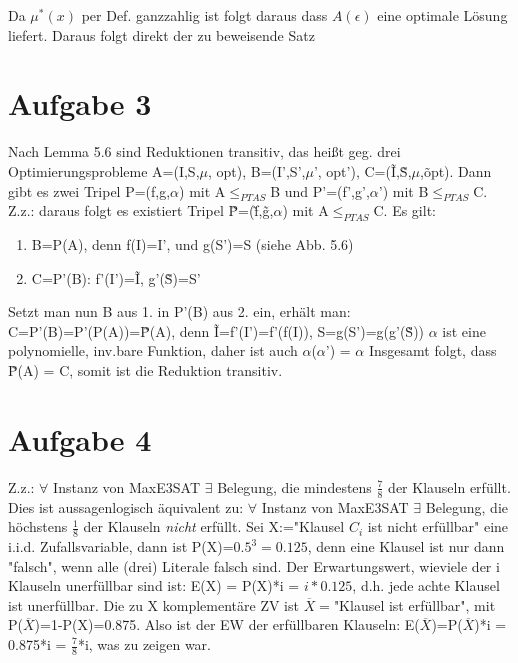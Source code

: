 \documentclass[a4paper,10pt,oneside,reqno]{scrartcl}
\begin{document}
Da $\mu^*(x)$ per Def. ganzzahlig ist folgt daraus dass $A(\epsilon)$ eine optimale Lösung liefert. Daraus folgt direkt der zu beweisende Satz
\section*{Aufgabe 3}%
Nach Lemma 5.6 sind Reduktionen transitiv, das heißt geg. drei Optimierungsprobleme A=(I,S,$\mu$, opt), B=(I',S',$\mu$', opt'), C=(\~{I},\~{S},\~{$\mu$},\~{o}pt).\newline
Dann gibt es zwei Tripel P=(f,g,$\alpha$) mit A$\leq_{PTAS}$B und P'=(f',g',$\alpha$') mit B$\leq_{PTAS}$C.\newline
Z.z.: daraus folgt es existiert Tripel \~{P}=(\~{f},\~{g},\~{$\alpha$}) mit A$\leq_{PTAS}$C.\newline
Es gilt:\begin{enumerate}
         \item B=P(A), denn f(I)=I', und g(S')=S (siehe Abb. 5.6)
         \item C=P'(B): f'(I')=\~{I}, g'(\~{S})=S'
        \end{enumerate}
        Setzt man nun B aus 1. in P'(B) aus 2. ein, erhält man:\newline
        C=P'(B)=P'(P(A))=\~{P}(A), denn \~{I}=f'(I')=f'(f(I)), S=g(S')=g(g'(\~{S}))\newline
        $\alpha$ ist eine polynomielle, inv.bare Funktion, daher ist auch $\alpha$($\alpha$') = \~{$\alpha$}\newline
        Insgesamt folgt, dass \~{P}(A) = C, somit ist die Reduktion transitiv.

\section*{Aufgabe 4}%
Z.z.: $\forall$ Instanz von MaxE3SAT $\exists$ Belegung, die mindestens $\frac{7}{8}$ der
Klauseln erfüllt. Dies ist aussagenlogisch äquivalent zu: \newline
$\forall$ Instanz von MaxE3SAT $\exists$ Belegung, die höchstens $\frac{1}{8}$ der
Klauseln \emph{nicht} erfüllt.\newline
Sei X:="Klausel $C_i$ ist nicht erfüllbar" eine i.i.d. Zufallsvariable, dann ist P(X)=$0.5^3=0.125$, denn eine Klausel ist nur dann "falsch", wenn alle (drei) Literale falsch sind. Der Erwartungswert,
wieviele der i Klauseln unerfüllbar sind ist:\newline
E(X) = P(X)*i = $i*0.125$, d.h. jede achte Klausel ist unerfüllbar. Die zu X komplementäre ZV ist $\overline{X}=$"Klausel ist erfüllbar", mit P($\overline{X}$)=1-P(X)=0.875.\newline
Also ist der EW der erfüllbaren Klauseln: E($\overline{X}$)=P($\overline{X}$)*i = 0.875*i = $\frac{7}{8}$*i, was zu zeigen war.
\end{document}
